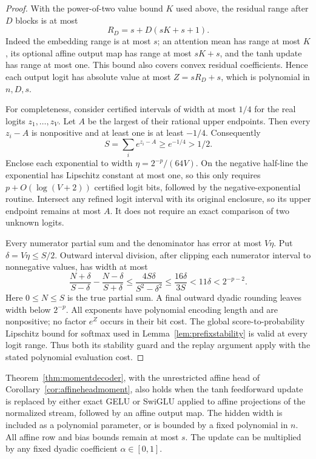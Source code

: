 \begin{proof}
With the power-of-two value bound $K$ used above, the residual
range after $D$ blocks is at most
\[
 R_D=s+D(sK+s+1).
\]
Indeed the embedding range is at most $s$; an attention mean has
range at most $K$, its optional affine output map has range at
most $sK+s$, and the tanh update has range at most one.  This
bound also covers convex residual coefficients.  Hence each
output logit has absolute value at most
$Z=sR_D+s$, which is polynomial in $n,D,s$.

For completeness, consider certified intervals of width at most
$1/4$ for the real logits $z_1,\ldots,z_V$.  Let $A$ be the
largest of their rational upper endpoints.  Then every
$z_i-A$ is nonpositive and at least one is at least $-1/4$.
Consequently
\[
 S=\sum_i e^{z_i-A}\ge e^{-1/4}>1/2.
\]
Enclose each exponential to width
$\eta=2^{-p}/(64V)$.  On the negative half-line the exponential
has Lipschitz constant at most one, so this only requires
$p+O(\log(V+2))$ certified logit bits, followed by the
negative-exponential routine.  Intersect any refined logit
interval with its original enclosure, so its upper endpoint
remains at most $A$.  It does not require an exact
comparison of two unknown logits.

Every numerator partial sum and the denominator has error at
most $V\eta$.  Put $\delta=V\eta\le S/2$.  Outward interval
division, after clipping each numerator interval to nonnegative
values, has width at most
\[
 \frac{N+\delta}{S-\delta}
 -\frac{N-\delta}{S+\delta}
 \le\frac{4S\delta}{S^2-\delta^2}
 \le\frac{16\delta}{3S}
 <11\delta<2^{-p-2}.
\]
Here $0\le N\le S$ is the true partial sum.  A final outward
dyadic rounding leaves
width below $2^{-p}$.  All exponents have polynomial encoding
length and are nonpositive; no factor $e^Z$ occurs in their
bit cost.  The global score-to-probability Lipschitz bound for
softmax used in Lemma~\ref{lem:prefixstability} is valid at
every logit range.  Thus both its stability guard and the replay
argument apply with the stated polynomial evaluation cost.
\end{proof}

\begin{corollary}
\label{cor:momentgeluswiglu}
Theorem~\ref{thm:momentdecoder}, with the unrestricted affine
head of Corollary~\ref{cor:affineheadmoment}, also holds when
the tanh feedforward update is replaced by either exact GELU
or SwiGLU applied to affine projections of the normalized
stream, followed by an affine output map.  The hidden width
is included as a polynomial parameter, or is bounded by a
fixed polynomial in $n$.  All affine row and bias bounds
remain at most $s$.  The update can be multiplied by any fixed
dyadic coefficient $\alpha\in[0,1]$.
\end{corollary}

